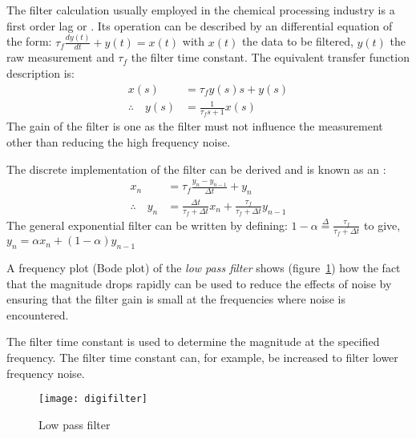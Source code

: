 The filter calculation usually employed in the chemical processing industry is a first order lag or  \citep[390]{Marlin00}. Its operation can be described by an differential equation of the form:
\(\tau_f\frac{dy(t)}{dt} + y(t) = x(t) \)
with $x(t)$ the data to be filtered, $y(t)$ the raw measurement and $\tau_f$ the filter time constant. The equivalent transfer function description is:
\begin{align}
	x(s) &=  \tau_f y(s)s + y(s)  \nonumber \\
	\therefore \quad y(s) &= \frac{1}{\tau_f s + 1}x(s)
\end{align}
The gain of the filter is one as the filter must not influence the measurement other than reducing the high frequency noise. 
	
The discrete implementation of the filter can be derived and is known as an  \citep[539]{Seborg89}:
\begin{align}
	x_n &= \tau_f \frac{y_n - y_{n-1}}{\Delta t} + y_n  \nonumber \\
	\therefore \quad y_n &= \frac{\Delta t}{\tau_f + \Delta t}x_n + \frac{\tau_f}{\tau_f + \Delta t}y_{n-1}
\end{align}
The general exponential filter can be written by defining:
\(1 - \alpha \stackrel{\Delta}{=} \frac{\tau_f}{\tau_f + \Delta t} \)
to give,
\(y_n = \alpha x_n + (1 - \alpha)y_{n-1} \)

A frequency plot (Bode plot) of the \emph{low pass filter} shows (figure~\ref{fig:digi:digifilter}) how the fact that the magnitude drops rapidly can be used to reduce the effects of noise by ensuring that the filter gain is small at the frequencies where noise is encountered. 

The filter time constant is used to determine the magnitude at the specified frequency. The filter time constant can, for example, be increased to filter lower frequency noise.
	\begin{figure}[htbp]
		\centering
		\texttt{[image: digifilter]}
		\caption{Low pass filter}
		\label{fig:digi:digifilter}
	\end{figure} 
	
